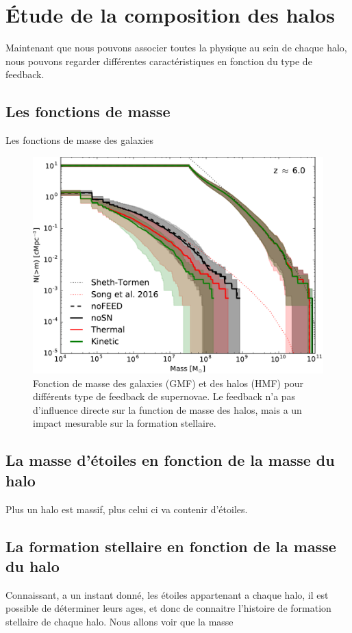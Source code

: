 \section{Étude de la composition des halos}

Maintenant que nous pouvons associer toutes la physique au sein de chaque halo, nous pouvons regarder  différentes caractéristiques en fonction du type de feedback.

\subsection{Les fonctions de masse}

Les fonctions de masse des galaxies 


\begin{figure}[bth]
		\includegraphics[width=.95\linewidth]{img/03/ghmf.pdf}
        \caption{Fonction de masse des galaxies (GMF) et des halos (HMF) pour différents type de feedback de supernovae.
        Le feedback n'a pas d'influence directe sur la function de masse des halos, mais a un impact mesurable sur la formation stellaire.
        }
 		\label{fig:ghmf}
\end{figure}



\subsection{La masse d'étoiles en fonction de la masse du halo}
Plus un halo est massif, plus celui ci va contenir d'étoiles.



\subsection{La formation stellaire en fonction de la masse du halo}
\label{sec:sfr_halo}
Connaissant, a un instant donné, les étoiles appartenant a chaque halo, il est possible de déterminer leurs ages, et donc de connaitre l'histoire de formation stellaire de chaque halo.
Nous allons voir que la masse 


